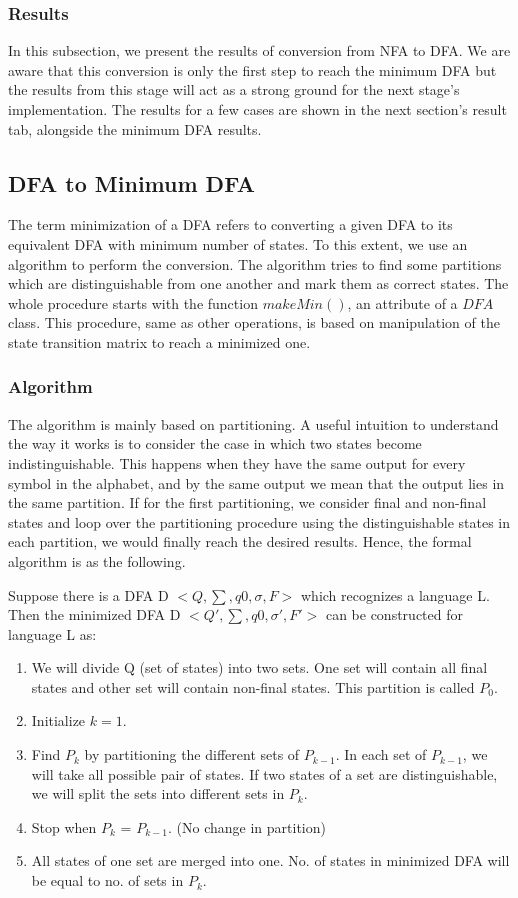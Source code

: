 \documentclass[
12pt, %
a4paper, %
oneside, %
headinclude,footinclude, %
BCOR5mm, %
]{scrartcl}
\begin{document}
\subsubsection{Results}
In this subsection, we present the results of conversion from NFA to DFA. We are aware that this conversion is only the first step to reach the minimum DFA but the results from this stage will act as a strong ground for the next stage's implementation. The results for a few cases are shown in the next section's result tab, alongside the minimum DFA results.

\subsection{DFA to Minimum DFA}
The term minimization of a DFA refers to converting a given DFA to its equivalent DFA with minimum number of states. To this extent, we use an algorithm to perform the conversion. The algorithm tries to find some partitions which are distinguishable from one another and mark them as correct states. The whole procedure starts with the function $makeMin()$, an attribute of a $DFA$ class. This procedure, same as other operations, is based on manipulation of the state transition matrix to reach a minimized one.
\subsubsection{Algorithm}
The algorithm is mainly based on partitioning. A useful intuition to understand the way it works is to consider the case in which two states become indistinguishable. This happens when they have the same output for every symbol in the alphabet, and by the same output we mean that the output lies in the same partition. If for the first partitioning, we consider final and non-final states and loop over the partitioning procedure using the distinguishable states in each partition, we would finally reach the desired results. Hence, the formal algorithm is as the following.

Suppose there is a DFA D $< Q, \sum, q0, \sigma, F >$ which recognizes a language L. Then the minimized DFA D $< Q', \sum, q0, \sigma', F' >$ can be constructed for language L as:

\begin{enumerate}
\item We will divide Q (set of states) into two sets. One set will contain all final states and other set will contain non-final states. This partition is called $P_0$.
\item Initialize $k = 1$.
\item Find $P_k$ by partitioning the different sets of $P_{k-1}$. In each set of $P_{k-1}$, we will take all possible pair of states. If two states of a set are distinguishable, we will split the sets into different sets in $P_k$.
\item Stop when $P_k$ = $P_{k-1}$. (No change in partition)
\item All states of one set are merged into one. No. of states in minimized DFA will be equal to no. of sets in $P_{k}$.
\end{enumerate}
\end{document}
